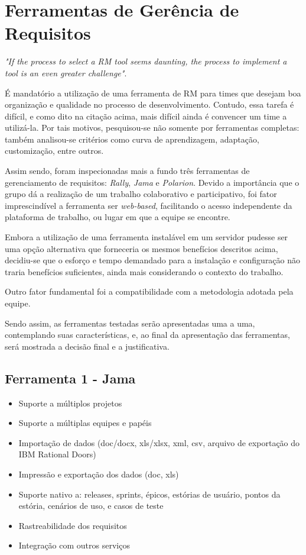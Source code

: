 \chapter[Ferramentas de Gerência de Requisitos]{Ferramentas de Gerência de Requisitos}

\emph{"If the process to select a RM tool seems daunting, the process to implement a tool is an even greater challenge"}\cite{beatty001}.

É mandatório a utilização de uma ferramenta de RM para times que desejam boa organização e qualidade no processo de desenvolvimento. Contudo, essa tarefa é difícil, e como dito na citação acima, mais difícil ainda é convencer um time a utilizá-la. Por tais motivos, pesquisou-se não somente por ferramentas completas: também analisou-se critérios como curva de aprendizagem, adaptação, customização, entre outros.

Assim sendo, foram inspecionadas mais a fundo três ferramentas de gerenciamento de requisitos: \emph{Rally}, \emph{Jama} e \emph{Polarion}. Devido a importância que o grupo dá a realização de um trabalho colaborativo e participativo, foi fator imprescindível a ferramenta ser \emph{web-based}, facilitando o acesso independente da plataforma de trabalho, ou lugar em que a equipe se encontre.

Embora a utilização de uma ferramenta instalável em um servidor pudesse ser uma opção alternativa que forneceria os mesmos benefícios descritos acima, decidiu-se que o esforço e tempo demandado para a instalação e configuração não traria benefícios suficientes, ainda mais considerando o contexto do trabalho.

Outro fator fundamental foi a compatibilidade com a metodologia adotada pela equipe.

Sendo assim, as ferramentas testadas serão apresentadas uma a uma, contemplando suas características, e, ao final da apresentação das ferramentas, será mostrada a decisão final e a justificativa.

\section{Ferramenta 1 - Jama}
\begin{itemize}
  \item Suporte a múltiplos projetos
  \item Suporte a múltiplas equipes e papéis
  \item Importação de dados (doc/docx, xls/xlsx, xml, csv, arquivo de exportação do IBM Rational Doors)
  \item Impressão e exportação dos dados (doc, xls)
  \item Suporte nativo a: releases, sprints, épicos, estórias de usuário, pontos da estória, cenários de uso, e casos de teste
  \item Rastreabilidade dos requisitos
  \item Integração com outros serviços
\end{itemize}

